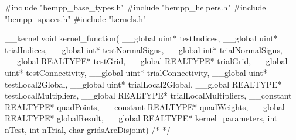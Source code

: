 \begin{opencl}
#include "bempp_base_types.h"
#include "bempp_helpers.h"
#include "bempp_spaces.h"
#include "kernels.h"

__kernel void kernel_function(
    __global uint* testIndices, __global uint* trialIndices,
    __global int* testNormalSigns, __global int* trialNormalSigns,
    __global REALTYPE* testGrid, __global REALTYPE* trialGrid,
    __global uint* testConnectivity, __global uint* trialConnectivity,
    __global uint* testLocal2Global, __global uint* trialLocal2Global,
    __global REALTYPE* testLocalMultipliers,
    __global REALTYPE* trialLocalMultipliers,
    __constant REALTYPE* quadPoints, __constant REALTYPE* quadWeights,
    __global REALTYPE* globalResult,
    __global REALTYPE* kernel_parameters,
    int nTest, int nTrial, char gridsAreDisjoint)
{
  /* */
}
\end{opencl}
